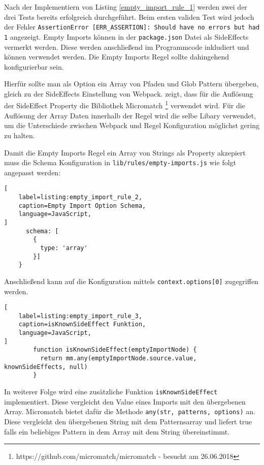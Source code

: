 Nach der Implementiern von Listing \ref{empty_import_rule_1} werden zwei der drei Tests bereits erfolgreich durchgeführt.  Beim ersten validen Test wird jedoch der Fehler \lstinline{AssertionError [ERR_ASSERTION]: Should have no errors but had 1} angezeigt. Empty Imports können in der \lstinline{package.json} Datei als SideEffects vermerkt werden. Diese werden anschließend im Programmcode inkludiert und können verwendet werden. Die Empty Imports Regel sollte dahingehend konfigurierbar sein.

Hierfür sollte man als Option ein Array von Pfaden und Glob Pattern übergeben, gleich zu der SideEffects Einstellung von Webpack. \textcite{WebpackTreeShaking} zeigt, dass für die Auflösung der SideEffect Property die Bibliothek Micromatch \footnote{https://github.com/micromatch/micromatch - besucht am 26.06.2018} verwendet wird. Für die Auflösung der Array Daten innerhalb der Regel wird die selbe Libary verwendet, um die Unterschiede zwischen Webpack und Regel Konfiguration möglichst gering zu halten.

Damit die Empty Imports Regel ein Array von Strings als Property akzepiert muss die Schema Konfiguration in \lstinline{lib/rules/empty-imports.js} wie folgt angepasst werden:

\begin{lstlisting}[
    label=listing:empty_import_rule_2,
	caption=Empty Import Option Schema,
	language=JavaScript,
]
      schema: [
        {
          type: 'array'
        }]
    }
\end{lstlisting}

Anschließend kann auf die Konfiguration mittels \lstinline{context.options[0]} zugegriffen werden.

\begin{lstlisting}[
    label=listing:empty_import_rule_3,
	caption=isKnownSideEffect Funktion,
	language=JavaScript,
]
        function isKnownSideEffect(emptyImportNode) {
          return mm.any(emptyImportNode.source.value, knownSideEffects, null)
        }
\end{lstlisting}

In weiterer Folge wird eine zusätzliche Funktion \lstinline{isKnownSideEffect} implementiert. Diese vergleicht den Value eines Imports mit den übergebenen Array. Micromatch bietet dafür die Methode \lstinline{any(str, patterns, options)} an. Diese vergleicht den übergebenen String mit dem Patternsarray und liefert true falls ein beliebiges Pattern in dem Array mit dem String übereinstimmt.

